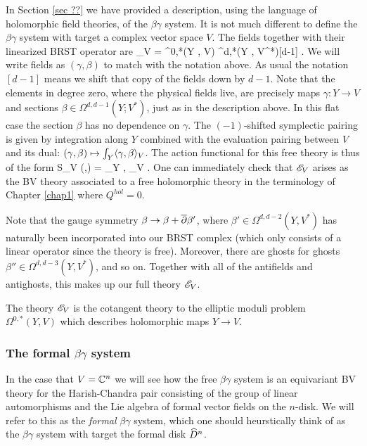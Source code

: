 \documentclass[10pt]{amsart}
\begin{document}
In Section \ref{sec ??} we have provided a description, using the language of holomorphic field theories, of the $\beta\gamma$ system.
It is not much different to define the $\beta\gamma$ system with target a complex vector space $V$. 
The fields together with their linearized BRST operator are
\ben
\sE_V = \Omega^{0,*}(Y , V) \oplus \Omega^{d,*}(Y , V^*)[d-1] .
\een
We will write fields as $(\gamma,\beta)$ to match with the notation above.
As usual the notation $[d-1]$ means we shift that copy of the fields down by $d-1$. 
Note that the elements in degree zero, where the physical fields live, are precisely maps $\gamma : Y \to V$ and sections $\beta \in\Omega^{d,d-1} (Y ; V^*)$, just as in the description above. 
In this flat case the section $\beta$ has no dependence on $\gamma$.
The $(-1)$-shifted symplectic pairing is given by integration along $Y$ combined with the evaluation pairing between $V$ and its dual: $(\gamma, \beta) \mapsto \int_Y \langle\gamma, \beta\rangle_V$. 
The action functional for this free theory is thus of the form
\ben
S_V (\beta,\gamma) = \int_Y \<\beta, \dbar \gamma\>_{V} .
\een
One can immediately check that $\mathscr E_V$ arises as the BV theory associated to a free holomorphic theory in the terminology of Chapter \ref{chap1} where $Q^{hol} = 0$. 

Note that the gauge symmetry $\beta \to \beta + \overline{\partial} \beta'$, where $\beta' \in \Omega^{d,d-2} (Y, V^*)$ has naturally been incorporated into our BRST complex (which only consists of a linear operator since the theory is free). 
Moreover, there are ghosts for ghosts $\beta'' \in \Omega^{d,d-3}(Y , V^*)$, and so on.
Together with all of the antifields and antighosts, this makes up our full theory $\mathscr E_V$. 

The theory $\mathscr E_V$ is the cotangent theory to the elliptic moduli problem $\Omega^{0,*}(Y, V)$ which describes holomorphic maps $Y \to V$.

\subsubsection{The formal $\beta\gamma$ system}

In the case that $V = \mathbb C^n$ we will see how the free $\beta\gamma$ system is an equivariant BV theory for the Harish-Chandra pair consisting of the group of linear automorphisms and the Lie algebra of formal vector fields on the $n$-disk.
We will refer to this as the {\em formal} $\beta\gamma$ system, which one should heurstically think of as the $\beta\gamma$ system with target the formal disk $\widehat{D}^n$.
\end{document}
